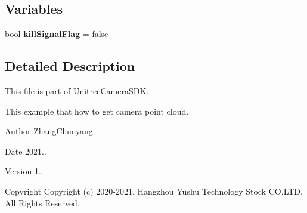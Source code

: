 \subsection*{Variables}
\begin{DoxyCompactItemize}
\item 
\mbox{\label{example__get_point_cloud_8cc_ace2ab20fcac45c041999dbe39df5ee4d}} 
bool {\bfseries kill\+Signal\+Flag} = false
\end{DoxyCompactItemize}


\subsection{Detailed Description}
This file is part of Unitree\+Camera\+S\+DK. 

This example that how to get camera point cloud. \begin{DoxyAuthor}{Author}
Zhang\+Chunyang 
\end{DoxyAuthor}
\begin{DoxyDate}{Date}
2021.. 
\end{DoxyDate}
\begin{DoxyVersion}{Version}
1.. 
\end{DoxyVersion}
\begin{DoxyCopyright}{Copyright}
Copyright (c) 2020-\/2021, Hangzhou Yushu Technology Stock C\+O.\+L\+TD. All Rights Reserved. 
\end{DoxyCopyright}
